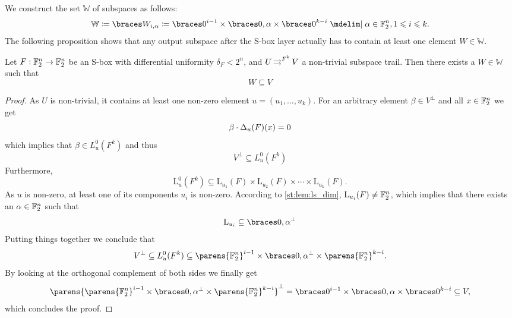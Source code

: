 We construct the set $\mathbb{W}$ of subspaces as follows:
\begin{equation*}
    \mathbb{W} \coloneqq \set{W_{i,\alpha} \coloneqq \set{0}^{i-1} \times \set{0,\alpha} \times \set{0}^{k-i} \given \alpha \in \F_2^n, 1 \leqslant i \leqslant k}.
\end{equation*}
The following proposition shows that any output subspace after the S-box layer actually has to contain at least one element $W \in \mathbb{W}$.
\begin{proposition}\label{st:prop:w_i_alpha}
    Let $F : \mathbb{F}_2^n \to \mathbb{F}_2^n$ be an S-box with differential uniformity $\delta_F < 2^n$, and $U \operatorname*{\rightrightarrows}^{F^k}_{} V$ a non-trivial subspace trail.
    Then there exists a $W \in \mathbb{W}$ such that
    \begin{equation*}
        W \subseteq V
    \end{equation*}
\end{proposition}
\begin{proof}
As $U$ is non-trivial, it contains at least one non-zero element $u=(u_1,\dots, u_k)$.
For an arbitrary element $\beta \in V^{\perp}$ and all $x \in \mathbb{F}_2^n$ we get
\begin{equation*}
    \beta \cdot \Delta_u(F)(x) = 0
\end{equation*}
which implies that $\beta \in L^0_u(F^k)$ and thus
\begin{equation*}
    V^{\perp} \subseteq L^0_u(F^k)
\end{equation*}
Furthermore,
\begin{equation*}
    \mathrm{L}^0_u(F^k) \subseteq \mathrm{L}_{u_1}(F) \times \mathrm{L}_{u_2}(F) \times \cdots \times \mathrm{L}_{u_k}(F).
\end{equation*}
As $u$ is non-zero, at least one of its components $u_i$ is non-zero.
According to \cref{st:lem:ls_dim}, $\mathrm{L}_{u_i}(F) \ne \mathbb{F}_2^n$, which implies that there exists an $\alpha \in \mathbb{F}_2^n$ such that
\begin{equation*}
    \mathrm{L}_{u_i} \subseteq \set{0,\alpha}^{\perp}
\end{equation*}
Putting things together we conclude that
\begin{equation*}
    V^{\perp} \subseteq L^0_u(F^k) \subseteq \parens{\F_2^n}^{i-1} \times \set{0,\alpha}^{\perp} \times \parens{\F_2^n}^{k-i}.
\end{equation*}
By looking at the orthogonal complement of both sides we finally get
\begin{equation*}
    \parens{\parens{\F_2^n}^{i-1} \times \set{0,\alpha}^{\perp} \times \parens{\F_2^n}^{k-i}}^{\perp} = \set{0}^{i-1} \times \set{0,\alpha} \times \set{0}^{k-i} \subseteq V,
\end{equation*}
which concludes the proof.
\end{proof}

